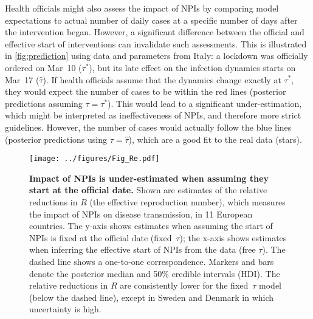 \documentclass[12pt]{extarticle}
\begin{document}
Health officials might also assess the impact of NPIs by comparing model expectations to actual number of daily cases at a specific number of days after the intervention began. 
However, a significant difference between the official and effective start of interventions can invalidate such assessments.
This is illustrated in \autoref{fig:prediction} using data and parameters from Italy: a lockdown was officially ordered on Mar~10 ($\tau^*$), but its late effect on the infection dynamics starts on Mar~17 ($\hat{\tau}$).
If health officials assume that the dynamics change exactly at $\tau^*$, they would expect the number of cases to be within the red lines (posterior predictions assuming $\tau=\tau^*$).
This would lead to a significant under-estimation, which might be interpreted as ineffectiveness of NPIs, and therefore more strict guidelines.
However, the number of cases would actually follow the blue lines (posterior predictions using $\tau=\hat{\tau}$), which are a good fit to the real data (stars).



\begin{figure}[h]
    \centering
	\texttt{[image: ../figures/Fig\_Re.pdf]}
    \caption{
    \textbf{Impact of NPIs is under-estimated when assuming they start at the official date.}
    Shown are estimates of the relative reductions in $R$ (the effective reproduction number), which measures the impact of NPIs on disease transmission, in 11 European countries.
     The y-axis shows estimates when assuming the start of NPIs is fixed at the official date (fixed~$\tau$); the x-axis shows estimates when inferring the effective start of NPIs from the data (free $\tau$). The dashed line shows a one-to-one correspondence.
     Markers and bars denote the posterior median and 50\% credible intervals (HDI).
    The relative reductions in $R$ are consistently lower for the fixed~$\tau$ model (below the dashed line), except in Sweden and Denmark in which uncertainty is high.
    } 
    \label{fig:Re}
\end{figure}
\end{document}
